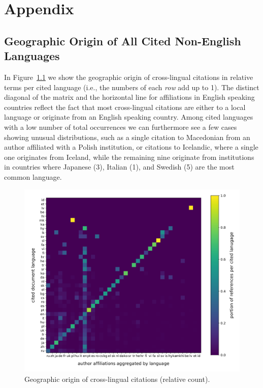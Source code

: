 \chapter{Appendix}

\section{Geographic Origin of All Cited Non-English Languages}\label{app:geo_origin}

In Figure~\ref{fig:geo_full} we show the geographic origin of cross-lingual citations in relative terms per cited language (i.e., the numbers of each \emph{row} add up to 1). The distinct diagonal of the matrix and the horizontal line for affiliations in English speaking countries reflect the fact that most cross-lingual citations are either to a local language or originate from an English speaking country. Among cited languages with a low number of total occurrences we can furthermore see a few cases showing unusual distributions, such as a single citation to Macedonian from an author affiliated with a Polish institution, or citations to Icelandic, where a single one originates from Iceland, while the remaining nine originate from institutions in countries where Japanese (3), Italian (1), and Swedish (5) are the most common language.

\begin{figure}[tb]
\centering
\includegraphics[width=\textwidth]{figures/ref_xling/citlang_to_author_aff_all_relative_crop.pdf}
\caption{Geographic origin of cross-lingual citations (relative count).} \label{fig:geo_full}
\end{figure}

